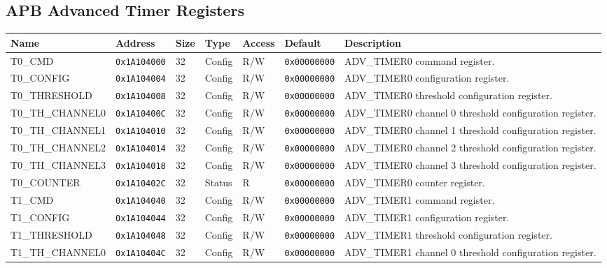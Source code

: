 
\subsection{APB Advanced Timer Registers}
{\small
\begin{tabularx}{\textwidth}{|l|l|l|l|l|l|X|}
  \hline
  \textbf{Name} & \textbf{Address}  & \textbf{Size} & \textbf{Type} & \textbf{Access} & \textbf{Default} & \textbf{Description} \\
  \hline
  T0\_CMD & \texttt{0x1A104000} & 32 & Config & R/W & \texttt{0x00000000} & ADV\_TIMER0 command register.\\
  \hline
  T0\_CONFIG & \texttt{0x1A104004} & 32 & Config & R/W & \texttt{0x00000000} & ADV\_TIMER0 configuration register.\\
  \hline
  T0\_THRESHOLD & \texttt{0x1A104008} & 32 & Config & R/W & \texttt{0x00000000} & ADV\_TIMER0 threshold configuration register.\\
  \hline
  T0\_TH\_CHANNEL0 & \texttt{0x1A10400C} & 32 & Config & R/W & \texttt{0x00000000} & ADV\_TIMER0 channel 0 threshold configuration register.\\
  \hline
  T0\_TH\_CHANNEL1 & \texttt{0x1A104010} & 32 & Config & R/W & \texttt{0x00000000} & ADV\_TIMER0 channel 1 threshold configuration register.\\
  \hline
  T0\_TH\_CHANNEL2 & \texttt{0x1A104014} & 32 & Config & R/W & \texttt{0x00000000} & ADV\_TIMER0 channel 2 threshold configuration register.\\
  \hline
  T0\_TH\_CHANNEL3 & \texttt{0x1A104018} & 32 & Config & R/W & \texttt{0x00000000} & ADV\_TIMER0 channel 3 threshold configuration register.\\
  \hline
  T0\_COUNTER & \texttt{0x1A10402C} & 32 & Status & R & \texttt{0x00000000} & ADV\_TIMER0 counter register.\\
  \hline
  T1\_CMD & \texttt{0x1A104040} & 32 & Config & R/W & \texttt{0x00000000} & ADV\_TIMER1 command register.\\
  \hline
  T1\_CONFIG & \texttt{0x1A104044} & 32 & Config & R/W & \texttt{0x00000000} & ADV\_TIMER1 configuration register.\\
  \hline
  T1\_THRESHOLD & \texttt{0x1A104048} & 32 & Config & R/W & \texttt{0x00000000} & ADV\_TIMER1 threshold configuration register.\\
  \hline
  T1\_TH\_CHANNEL0 & \texttt{0x1A10404C} & 32 & Config & R/W & \texttt{0x00000000} & ADV\_TIMER1 channel 0 threshold configuration register.\\

\end{tabularx}}
